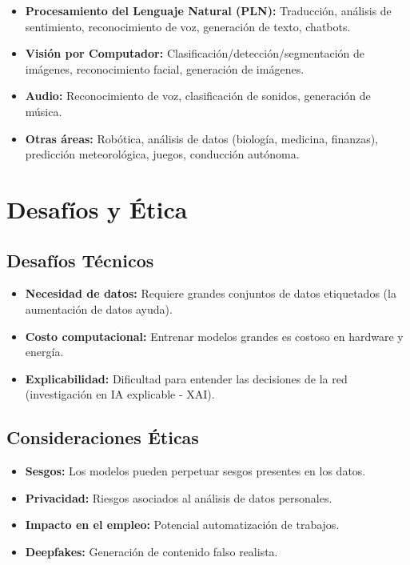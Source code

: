 \documentclass{article}
\begin{document}
\begin{itemize}
    \item \textbf{Procesamiento del Lenguaje Natural (PLN):} Traducción, análisis de sentimiento, reconocimiento de voz, generación de texto, chatbots.
    \item \textbf{Visión por Computador:} Clasificación/detección/segmentación de imágenes, reconocimiento facial, generación de imágenes.
    \item \textbf{Audio:} Reconocimiento de voz, clasificación de sonidos, generación de música.
    \item \textbf{Otras áreas:} Robótica, análisis de datos (biología, medicina, finanzas), predicción meteorológica, juegos, conducción autónoma.
\end{itemize}

\section{Desafíos y Ética}

\subsection{Desafíos Técnicos}

\begin{itemize}
    \item \textbf{Necesidad de datos:} Requiere grandes conjuntos de datos etiquetados (la aumentación de datos ayuda).
    \item \textbf{Costo computacional:} Entrenar modelos grandes es costoso en hardware y energía.
    \item \textbf{Explicabilidad:} Dificultad para entender las decisiones de la red (investigación en IA explicable - XAI).
\end{itemize}

\subsection{Consideraciones Éticas}

\begin{itemize}
    \item \textbf{Sesgos:} Los modelos pueden perpetuar sesgos presentes en los datos.
    \item \textbf{Privacidad:} Riesgos asociados al análisis de datos personales.
    \item \textbf{Impacto en el empleo:} Potencial automatización de trabajos.
     \item \textbf{Deepfakes:} Generación de contenido falso realista.
\end{itemize}
\end{document}
